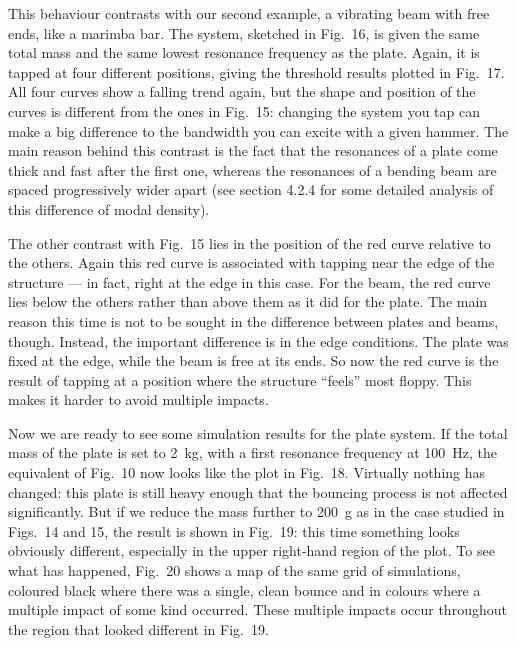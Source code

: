   This behaviour contrasts with our second example, a vibrating beam with free 
  ends, like a marimba bar. The system, sketched in Fig.\ 16, is given the same 
  total mass and the same lowest resonance frequency as the plate. Again, it is 
  tapped at four different positions, giving the threshold results plotted in 
  Fig.\ 17. All four curves show a falling trend again, but the shape and 
  position of the curves is different from the ones in Fig.\ 15: changing the 
  system you tap can make a big difference to the bandwidth you can excite with 
  a given hammer. The main reason behind this contrast is the fact that the 
  resonances of a plate come thick and fast after the first one, whereas the 
  resonances of a bending beam are spaced progressively wider apart (see 
  section 4.2.4 for some detailed analysis of this difference of modal 
  density). 

  The other contrast with Fig.\ 15 lies in the position of the red curve 
  relative to the others. Again this red curve is associated with tapping near 
  the edge of the structure — in fact, right at the edge in this case. For the 
  beam, the red curve lies below the others rather than above them as it did 
  for the plate. The main reason this time is not to be sought in the 
  difference between plates and beams, though. Instead, the important 
  difference is in the edge conditions. The plate was fixed at the edge, while 
  the beam is free at its ends. So now the red curve is the result of tapping 
  at a position where the structure “feels” most floppy. This makes it harder 
  to avoid multiple impacts. 

  Now we are ready to see some simulation results for the plate system. If the 
  total mass of the plate is set to 2~kg, with a first resonance frequency at 
  100~Hz, the equivalent of Fig.\ 10 now looks like the plot in Fig.\ 18. 
  Virtually nothing has changed: this plate is still heavy enough that the 
  bouncing process is not affected significantly. But if we reduce the mass 
  further to 200~g as in the case studied in Figs.\ 14 and 15, the result is 
  shown in Fig.\ 19: this time something looks obviously different, especially 
  in the upper right-hand region of the plot. To see what has happened, Fig.\ 
  20 shows a map of the same grid of simulations, coloured black where there 
  was a single, clean bounce and in colours where a multiple impact of some 
  kind occurred. These multiple impacts occur throughout the region that looked 
  different in Fig.\ 19. 

